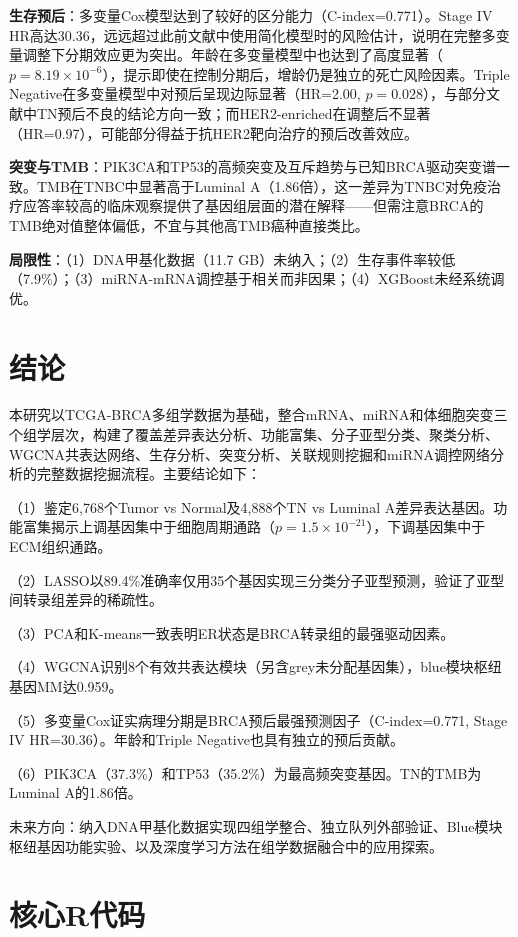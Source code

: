 \documentclass[12pt,a4paper,openany]{ctexbook}
\begin{document}
\textbf{生存预后}：多变量Cox模型达到了较好的区分能力（C-index=0.771）。Stage IV HR高达30.36，远远超过此前文献中使用简化模型时的风险估计，说明在完整多变量调整下分期效应更为突出。年龄在多变量模型中也达到了高度显著（$p=8.19\times10^{-6}$），提示即使在控制分期后，增龄仍是独立的死亡风险因素。Triple Negative在多变量模型中对预后呈现边际显著（HR=2.00, $p=0.028$），与部分文献中TN预后不良的结论方向一致；而HER2-enriched在调整后不显著（HR=0.97），可能部分得益于抗HER2靶向治疗的预后改善效应。

\textbf{突变与TMB}：PIK3CA和TP53的高频突变及互斥趋势与已知BRCA驱动突变谱一致。TMB在TNBC中显著高于Luminal A（1.86倍），这一差异为TNBC对免疫治疗应答率较高的临床观察提供了基因组层面的潜在解释——但需注意BRCA的TMB绝对值整体偏低，不宜与其他高TMB癌种直接类比。

\textbf{局限性}：（1）DNA甲基化数据（11.7 GB）未纳入；（2）生存事件率较低（7.9\%）；（3）miRNA-mRNA调控基于相关而非因果；（4）XGBoost未经系统调优。

\chapter{结论}
本研究以TCGA-BRCA多组学数据为基础，整合mRNA、miRNA和体细胞突变三个组学层次，构建了覆盖差异表达分析、功能富集、分子亚型分类、聚类分析、WGCNA共表达网络、生存分析、突变分析、关联规则挖掘和miRNA调控网络分析的完整数据挖掘流程。主要结论如下：

（1）鉴定6,768个Tumor vs Normal及4,888个TN vs Luminal A差异表达基因。功能富集揭示上调基因集中于细胞周期通路（$p=1.5\times10^{-21}$），下调基因集中于ECM组织通路。

（2）LASSO以89.4\%准确率仅用35个基因实现三分类分子亚型预测，验证了亚型间转录组差异的稀疏性。

（3）PCA和K-means一致表明ER状态是BRCA转录组的最强驱动因素。

（4）WGCNA识别8个有效共表达模块（另含grey未分配基因集），blue模块枢纽基因MM达0.959。

（5）多变量Cox证实病理分期是BRCA预后最强预测因子（C-index=0.771, Stage IV HR=30.36）。年龄和Triple Negative也具有独立的预后贡献。

（6）PIK3CA（37.3\%）和TP53（35.2\%）为最高频突变基因。TN的TMB为Luminal A的1.86倍。

未来方向：纳入DNA甲基化数据实现四组学整合、独立队列外部验证、Blue模块枢纽基因功能实验、以及深度学习方法在组学数据融合中的应用探索。

\printbibliography

\newpage
\appendix
\chapter{核心R代码}
\end{document}
